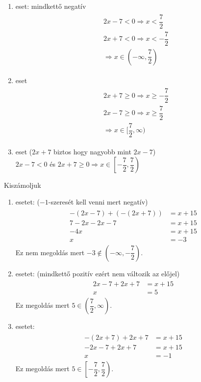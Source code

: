 \documentclass[12pt,a4paper,fleqn]{article}
\begin{document}
\begin{enumerate}
  \item eset: mindkettő negatív
  \begin{align*}
    \begin{split}
      &2x - 7 < 0 \Rightarrow x < \dfrac{7}{2} \\
      &2x + 7 < 0 \Rightarrow x < -\dfrac{7}{2} \\
      &\Longrightarrow x \in (-\infty, \dfrac{7}{2})
    \end{split}
  \end{align*}
  \item eset
  \begin{align*}
    \begin{split}
      &2x + 7 \geq 0 \Rightarrow x \geq -\dfrac{7}{2} \\
      &2x - 7 \geq 0 \Rightarrow x \geq \dfrac{7}{2} \\
      &\Longrightarrow x \in [\dfrac{7}{2}, \infty)
    \end{split}
  \end{align*}
  \item eset ($2x+7$ biztos hogy nagyobb mint $2x-7$) \\
  $2x-7<0$ és $2x+7 \geq 0 \Rightarrow x \in \left[ -\dfrac{7}{2}, \dfrac{7}{2} \right)$
\end{enumerate}
Kiszámoljuk
\begin{enumerate}
  \item esetet: ($-1$-szeresét kell venni mert negatív) \\
  \begin{align*}
    \begin{split}
      -(2x-7)+(-(2x+7)) &= x + 15 \\
      7-2x-2x-7&=x+15 \\
      -4x&=x+15 \\
      x &=-3
    \end{split}
  \end{align*}
  Ez nem megoldás mert $-3 \notin (-\infty, -\dfrac{7}{2})$.
  \item esetet: (mindkettő pozitív ezért nem változik az előjel)
  \begin{align*}
    \begin{split}
      2x-7+2x+7 &= x + 15 \\
      x &= 5
    \end{split}
  \end{align*}
  Ez megoldás mert $5 \in (\dfrac{7}{2}, \infty)$.
  \item esetet:
  \begin{align*}
    \begin{split}
      -(2x+7)+2x+7 &= x + 15 \\
      -2x-7+2x+7 &= x + 15 \\
      x &= -1
    \end{split}
  \end{align*}
  Ez megoldás mert $5 \in \left[ -\dfrac{7}{2}, \dfrac{7}{2} \right)$.
\end{enumerate}
\end{document}

